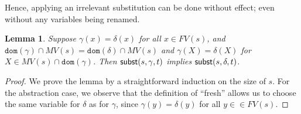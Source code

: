 \documentclass{lmcs}
\theoremstyle{theorem}\newtheorem{theorem}{Theorem}
\theoremstyle{theorem}\newtheorem{lemma}[theorem]{Lemma}
\theoremstyle{theorem}\newtheorem{corollary}[theorem]{Corollary}
\theoremstyle{definition}\newtheorem{definition}[theorem]{Definition}
\theoremstyle{definition}\newtheorem{example}[theorem]{Example}
\newcommand{\FV}{\mathit{FV}}
\newcommand{\FMV}{\mathit{MV}}
\newcommand{\domain}{\mathtt{dom}}
\newcommand{\identifier}[1]{\mathtt{#1}}
\newcommand{\afun}{\identifier{f}}
\newcommand{\avar}{x}
\newcommand{\bvar}{y}
\newcommand{\cvar}{z}
\newcommand{\Avar}{X}
\newcommand{\abs}[2]{\lambda #1.#2}
\newcommand{\tuple}[2]{\llparenthesis #1,\dots,#2 \rrparenthesis}
\begin{document}
Hence, applying an irrelevant substitution can be done without effect; even
without any variables being renamed.

\begin{lemma}\label{lem:substextend}
Suppose $\gamma(x) = \delta(x)$ for all $x \in \FV(s)$, and $\domain(\gamma)
\cap \FMV(s) = \domain(\delta) \cap \FMV(s)$ and $\gamma(\Avar) = \delta(\Avar)$
for $\Avar \in \FMV(s) \cap \domain(\gamma)$.  Then $\mathsf{subst}(s,\gamma,t)$
implies $\mathsf{subst}(s,\delta,t)$.
\end{lemma}

\begin{proof}
We prove the lemma by a straightforward induction on the size of $s$.
For the abstraction case, we observe that the definition of ``fresh'' allows us
to choose the same variable for $\delta$ as for $\gamma$, since $\gamma(\bvar) =
\delta(\bvar)$ for all $\bvar \in \in \FV(s)$.

\end{proof}
\end{document}

